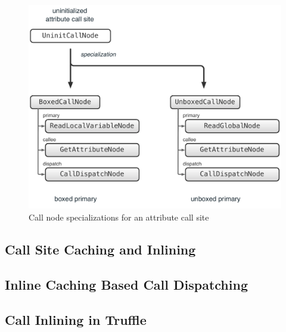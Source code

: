\begin{figure}
\centering
\includegraphics[scale=.5]{figures/ch5-call-node-specialization-attribute}
\caption{Call node specializations for an attribute call site}
\label{fig:ch5-call-node-specialization-attribute}
\end{figure}



\subsection{Call Site Caching and Inlining}
\label{sec:ch5-call-site-caching-and-inlining}

\subsection{Inline Caching Based Call Dispatching}

\subsection{Call Inlining in Truffle}
